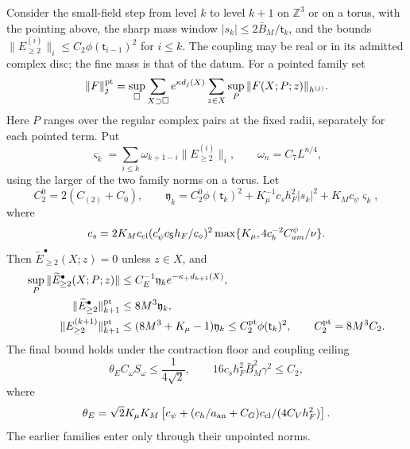 \documentclass[11pt,letterpaper,reqno]{amsart}
\makeatletter
\theoremstyle{definition}
\newcommand{\ms@minorstart}{%
  \pushQED{\qed}\renewcommand{\qedsymbol}{$\blacksquare$}}
\newenvironment{lemma}[1][]{\ms@minorstart\ms@lemma[#1]}
  {\popQED\endms@lemma}
\theoremstyle{remark}
\makeatother
\begin{document}
\begin{lemma}[Summing the pointers]\label{C-423-17}
Consider the small-field step from level $k$ to level $k+1$
on $\mathbb Z^3$ or on a torus, with the pointing above,
the sharp mass window $|s_k|\le2\bar B_M/\mathsf t_k$,
and the bounds
$\|E^{(i)}_{\ge2}\|_i\le C_2\phi(\mathsf t_{i-1})^2$
for $i\le k$. The coupling may be real or in its admitted
complex disc; the fine mass is that of the datum.
For a pointed family set
\[
 \|F\|^{\rm pt}_j
 =\sup_\square\sum_{X\supset\square}e^{\kappa d_j(X)}
       \sum_{z\in X}\sup_P\|F(X;P;z)\|_{h^{(j)}}.
\]
Here $P$ ranges over the regular complex pairs at the fixed
radii, separately for each pointed term. Put
\[
 \varsigma_k=\sum_{i\le k}\omega_{k+1-i}
                          \|E^{(i)}_{\ge2}\|_i,
 \qquad \omega_n=C_7L^{n/4},
\]
using the larger of the two family norms on a torus. Let
\[
 C_2^0=2(C_{(2)}+C_0),\qquad
 \mathfrak y_k=C_2^0\phi(\mathsf t_k)^2
       +K_\mu^{-1}c_sh_F^2|s_k|^2+K_Mc_\psi\varsigma_k,
\]
where
\[
 c_s=2K_Mc_{\rm cl}
       (c'_\psi c_{\mathsf S}h_F/c_\diamond)^2
       \max\{K_\mu,4c_b^{-2}C^\psi_{am}/\nu\}.
\]
Then $\widetilde E^\bullet_{\ge2}(X;z)=0$ unless $z\in X$,
and
\begin{align*}
 \sup_P\|\widetilde E^\bullet_{\ge2}(X;P;z)\|
       &\le C_E^{-1}\mathfrak y_k e^{-\kappa_+d_{k+1}(X)},\\
 \|\widetilde E^\bullet_{\ge2}\|^{\rm pt}_{k+1}
       &\le8M^3\mathfrak y_k,\\
 \|E^{(k+1)}_{\ge2}\|^{\rm pt}_{k+1}
       &\le(8M^3+K_\mu-1)\mathfrak y_k
        \le C_2^{\rm pt}\phi(\mathsf t_k)^2,
       \qquad C_2^{\rm pt}=8M^3C_2.
\end{align*}
The final bound holds under the contraction floor and coupling
ceiling
\[
 \theta_E C_\omega S_\omega\le\frac1{4\sqrt2},
 \qquad16c_sh_F^2\bar B_M^2\gamma^2\le C_2,
\]
where
\[
 \theta_E=\sqrt2K_\mu K_M
 \left[c_\psi+
       (c_h/a_{\rm an}+C_G)c_{\rm cl}/(4C_Vh_F^2)\right].
\]
The earlier families enter only through their unpointed norms.
\end{lemma}
\end{document}
